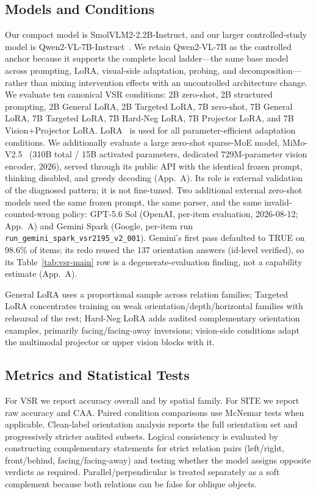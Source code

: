 \documentclass[10pt,twocolumn,letterpaper]{article}
\newcommand{\modelsmall}{SmolVLM2-2.2B-Instruct}
\newcommand{\modellarge}{Qwen2-VL-7B-Instruct}
\newcommand{\modelfrontier}{MiMo-V2.5}
\begin{document}
\subsection{Models and Conditions}
Our compact model is \modelsmall{}, and our larger controlled-study model is \modellarge{}~\cite{wang2024qwen2vl}. We retain Qwen2-VL-7B as the controlled anchor because it supports the complete local ladder---the same base model across prompting, LoRA, visual-side adaptation, probing, and decomposition---rather than mixing intervention effects with an uncontrolled architecture change. We evaluate ten canonical VSR conditions: 2B zero-shot, 2B structured prompting, 2B General LoRA, 2B Targeted LoRA, 7B zero-shot, 7B General LoRA, 7B Targeted LoRA, 7B Hard-Neg LoRA, 7B Projector LoRA, and 7B Vision+Projector LoRA. LoRA~\cite{hu2021lora} is used for all parameter-efficient adaptation conditions. We additionally evaluate a large zero-shot sparse-MoE model, \modelfrontier{}~\cite{mimov25} (310B total / 15B activated parameters, dedicated 729M-parameter vision encoder, 2026), served through its public API with the identical frozen prompt, thinking disabled, and greedy decoding (App.~A). Its role is external validation of the diagnosed pattern; it is not fine-tuned. Two additional external zero-shot models used the same frozen prompt, the same parser, and the same invalid-counted-wrong policy: GPT-5.6 Sol (OpenAI, per-item evaluation, 2026-08-12; App.~A) and Gemini Spark (Google, per-item run \texttt{run\_gemini\_spark\_vsr2195\_v2\_001}). Gemini's first pass defaulted to TRUE on 98.6\% of items; its redo reused the 137 orientation answers (id-level verified), so its Table~\ref{tab:vsr-main} row is a degenerate-evaluation finding, not a capability estimate (App.~A).

General LoRA uses a proportional sample across relation families; Targeted LoRA concentrates training on weak orientation/depth/horizontal families with rehearsal of the rest; Hard-Neg LoRA adds audited complementary orientation examples, primarily facing/facing-away inversions; vision-side conditions adapt the multimodal projector or upper vision blocks with it.
\subsection{Metrics and Statistical Tests}
For VSR we report accuracy overall and by spatial family. For SITE we report raw accuracy and CAA. Paired condition comparisons use McNemar tests when applicable. Clean-label orientation analysis reports the full orientation set and progressively stricter audited subsets. Logical consistency is evaluated by constructing complementary statements for strict relation pairs (left/right, front/behind, facing/facing-away) and testing whether the model assigns opposite verdicts as required. Parallel/perpendicular is treated separately as a soft complement because both relations can be false for oblique objects.
\end{document}
